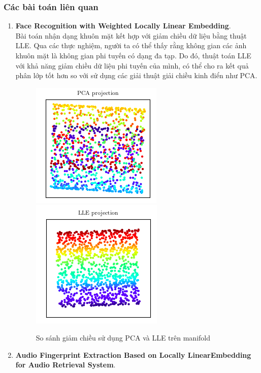\subsubsection{Các bài toán liên quan}
\begin{enumerate}
	\item \textbf{Face Recognition with Weighted Locally Linear Embedding}.\\ Bài toán nhận dạng khuôn mặt kết hợp với giảm chiều dữ liệu bằng thuật LLE. Qua các thực nghiệm, người ta có thể thấy rằng không gian các ảnh khuôn mặt là không gian phi tuyến có dạng đa tạp. Do đó, thuật toán LLE với khả năng giảm chiều dữ liệu phi tuyến của mình, có thể cho ra kết quả phân lớp tốt hơn so với sử dụng các giải thuật giải chiều kinh điển như PCA.
	\begin{figure}[H]
		\begin{center}
			\includegraphics[scale=0.6]{images/ex1/pca.png}
			\includegraphics[scale=0.6]{images/ex1/lle.png}
			\caption{So sánh giảm chiều sử dụng PCA và LLE trên manifold}
		\end{center}
	\end{figure}
	\item \textbf{Audio Fingerprint Extraction Based on Locally LinearEmbedding for Audio Retrieval System}. 
	

\end{enumerate}
